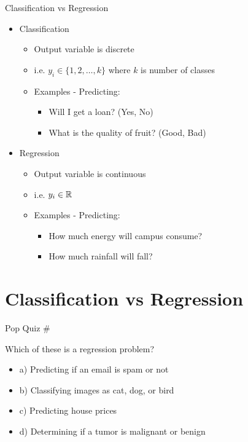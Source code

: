 \documentclass[usenames,dvipsnames]{beamer}
\begin{document}
\begin{frame}{Classification vs Regression}
\begin{itemize}
	\item Classification
	\begin{itemize}
		\item \pause Output variable is discrete
		\item \pause i.e.  $y_i \in \{1, 2, \ldots, k\}$ where $k$ is number of classes 
		\item \pause Examples - Predicting: 
		\begin{itemize}
			\item \pause Will I get a loan? (Yes, No)
			\item \pause What is the quality of fruit? (Good, Bad)
		\end{itemize}
	\end{itemize}
	\item \pause Regression
	\begin{itemize}
		\item \pause Output variable is continuous
		\item \pause i.e.  $y_i \in \mathbb{R}$ 
		\item \pause Examples - Predicting: 
		\begin{itemize}
			\item \pause How much energy will campus consume? 
			\item \pause How much rainfall will fall?
		\end{itemize}
	\end{itemize}
\end{itemize}

\end{frame}




\section{Classification vs Regression}

\begin{frame}{Pop Quiz \#\thepopquiz}
\begin{popquizbox}{\thepopquiz}
Which of these is a regression problem?
\begin{itemize}
	\item a) Predicting if an email is spam or not
	\item b) Classifying images as cat, dog, or bird
	\item c) Predicting house prices
	\item d) Determining if a tumor is malignant or benign
\end{itemize}
\end{popquizbox}
\end{frame}
\end{document}
